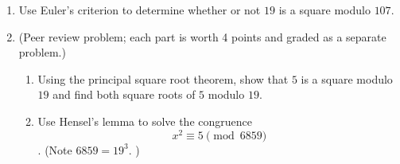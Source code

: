 \documentclass[12pt]{article}
\begin{document}
\begin{enumerate}
\item Use Euler's criterion to determine whether or not $19$ is a square modulo $107$. 

\item(Peer review problem; each part is worth 4 points and graded as a separate problem.)  
\begin{enumerate}
\item Using the principal square root theorem, show that $5$ is a square modulo $19$ and find both square roots of $5$ modulo $19$. 
\item Use Hensel's lemma to solve the congruence $$x^2
\equiv 5\pmod{6859}$$. (Note $6859=19^3$. )
\end{enumerate}


\end{enumerate}
\end{document}
